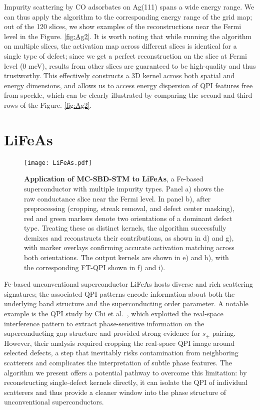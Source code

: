 Impurity scattering by CO adsorbates on Ag(111) spans a wide energy range. We can thus apply the algorithm to the corresponding energy range of the grid map; out of the 120 slices, we show examples of the reconstructions near the Fermi level in the Figure. \ref{fig:Ag2}. It is worth noting that while running the algorithm on multiple slices, the activation map across different slices is identical for a single type of defect; since we get a perfect reconstruction on the slice at Fermi level (0 meV), results from other slices are guaranteed to be high-quality and thus trustworthy. This effectively constructs a 3D kernel across both spatial and energy dimensions, and allows us to access energy dispersion of QPI features free from speckle, which can be clearly illustrated by comparing the second and third rows of the Figure. \ref{fig:Ag2}.
\section{LiFeAs}

\begin{figure}
	\texttt{[image: LiFeAs.pdf]} 
	\centering
	\caption[\textbf{Application of MC-SBD-STM to LiFeAs}]{\textbf{Application of MC-SBD-STM to LiFeAs}, a Fe-based superconductor with multiple impurity types. Panel a) shows the raw conductance slice near the Fermi level. In panel b), after preprocessing (cropping, streak removal, and defect center masking), red and green markers denote two orientations of a dominant defect type. Treating these as distinct kernels, the algorithm successfully demixes and reconstructs their contributions, as shown in d) and g), with marker overlays confirming accurate activation matching across both orientations. The output kernels are shown in e) and h), with the corresponding FT-QPI shown in f) and i).}
	\label{fig:LiFeAs}
\end{figure}
Fe-based unconventional superconductor LiFeAs hosts diverse and rich scattering signatures; the associated \ac{QPI} patterns encode information about both the underlying band structure and the superconducting order parameter. A notable example is the \ac{QPI} study by Chi et al.~\cite{chiSignInversionSuperconducting2014}, which exploited the real-space interference pattern to extract phase-sensitive information on the superconducting gap structure and provided strong evidence for $s_{\pm}$ pairing. However, their analysis required cropping the real-space QPI image around selected defects, a step that inevitably risks contamination from neighboring scatterers and complicates the interpretation of subtle phase features. The algorithm we present offers a potential pathway to overcome this limitation: by reconstructing single-defect kernels directly, it can isolate the QPI of individual scatterers and thus provide a cleaner window into the phase structure of unconventional superconductors.


